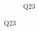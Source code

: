 \documentclass[english, 12pt, a4paper, pdftex, elec, utf8]{aaltothesis}
\begin{document}
\begin{figure}[h!]
\begin{subfigure}[b]{0.49\textwidth}
		\caption*{Q23}
	\end{subfigure}
\end{figure}

\clearpage




%
%
%
%
%
%
%
\end{document}
